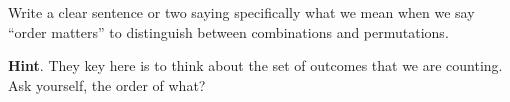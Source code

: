\documentclass{book}
\begin{document}
\setcounter{cpjt}{118}
\addtocounter{cpjt}{-1}
\begin{activity}\label{activity-111}
\hypertarget{p-798}{}%
Write a clear sentence or two saying specifically what we mean when we say ``order matters'' to distinguish between combinations and permutations.%
\par\smallskip%
\noindent\textbf{Hint}.\hypertarget{hint-77}{}\quad%
\hypertarget{p-799}{}%
They key here is to think about the set of outcomes that we are counting.  Ask yourself, the order of what?%
\end{activity}

\clearpage
\end{document}
